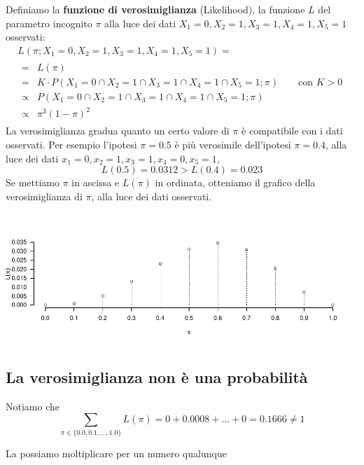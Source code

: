 \documentclass[
  11pt,
]{book}
\theoremstyle{mytheoremstyle}
\theoremstyle{mydefstyle}
\begin{document}
Definiamo la \textbf{funzione di verosimiglianza} (Likelihood), la funzione \(L\) del parametro incognito \(\pi\) alla luce dei dati \(X_1=0,X_2=1,X_3=1,X_4=1,X_5=1\) osservati:
\begin{multline*}
  L(\pi;X_1=0,X_2=1,X_3=1,X_4=1,X_5=1) =  \\
  \begin{array}{ll}
     = &L(\pi)\\
     = &K\cdot P(X_1=0\cap X_2=1\cap X_3=1\cap X_4=1\cap X_5=1;\pi) \qquad \text{con $K> 0$}\\
     \propto & P(X_1=0\cap X_2=1\cap X_3=1\cap X_4=1\cap X_5=1;\pi)\\
     \propto & \pi^3(1-\pi)^2
  \end{array}
\end{multline*}
La verosimiglianza gradua quanto un certo valore di \(\pi\) è compatibile con i dati
osservati. Per esempio l'ipotesi \(\pi=0.5\) è più verosimile dell'ipotesi \(\pi=0.4\), alla luce dei dati
\(x_1=0,x_2=1,x_3=1,x_4=0,x_5=1\),
\[
L(0.5)=0.0312>L(0.4)=0.023
\]
Se mettiamo \(\pi\) in ascissa e \(L(\pi)\) in ordinata, otteniamo il grafico della verosimiglianza di \(\pi\), alla luce dei dati osservati.

\begin{center}\includegraphics{Appunti_di_Statistica_2025_files/figure-latex/12-Verosimiglianza-4-1} \end{center}

\subsection{La verosimiglianza non è una probabilità}\label{la-verosimiglianza-non-uxe8-una-probabilituxe0}

Notiamo che
\[\sum_{\pi\in\{0.0,0.1,...,1.0\}}L(\pi) = 0+0.0008+...+0=0.1666\neq 1\]

La possiamo moltiplicare per un numero qualunque
\end{document}
